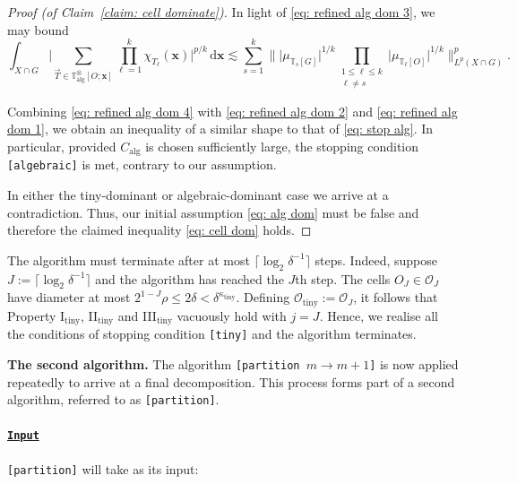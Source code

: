 \documentclass[reqno]{amsart}
\numberwithin{equation}{section}
\newcommand{\T}{\mathbb{T}}
\newcommand{\cO}{\mathcal{O}}
\newcommand{\ud}{\mathrm{d}}
\newcommand{\bx}{\mathbf{x}}
\theoremstyle{plain}
\theoremstyle{definition}
\newcommand{\ttiny}{\mathrm{tiny}}
\newcommand{\alg}{\mathrm{alg}}
\newcommand{\ceil}[1]{\lceil #1 \rceil }
\begin{document}
\begin{proof}[Proof (of Claim~\ref{claim: cell dominate})]
In light of \eqref{eq: refined alg dom 3}, we may bound 
\begin{equation}
\label{eq: refined alg dom 4}
     \int_{X \cap G} \Big|\sum_{\vec{T} \in \T^{\otimes}_{\alg}[O;\bx]} \prod_{\ell = 1}^k \chi_{T_\ell}(\bx) \Big|^{p/k} \,\ud \bx \lesssim \sum_{s = 1}^k \Big\|\big| \mu_{\T_s[G]} \big|^{1/k}\prod_{\substack{1 \leq \ell  \leq k\\ \ell \neq s}}\big| \mu_{\T_{\ell}[O]} \big|^{1/k}\Big\|_{L^p(X \cap G)}^p.
\end{equation}

Combining \eqref{eq: refined alg dom 4} with \eqref{eq: refined alg dom 2} and \eqref{eq: refined alg dom 1}, we obtain an inequality of a similar shape to that of \eqref{eq: stop alg}. In particular, provided $C_{\alg}$ is chosen sufficiently large, the stopping condition \texttt{[algebraic]} is met, contrary to our assumption.\medskip

In either the tiny-dominant or algebraic-dominant case we arrive at a contradiction. Thus, our initial assumption \eqref{eq: alg dom} must be false and therefore the claimed inequality \eqref{eq: cell dom} holds.
\end{proof}

The algorithm must terminate after at most $\ceil{\log_2 \delta^{-1}}$ steps. Indeed, suppose $J := \ceil{\log_2 \delta^{-1}}$ and the algorithm has reached the $J$th step. The cells $O_J \in \cO_J$ have diameter at most $2^{1-J}\rho  \leq 2\delta < \delta^{\kappa_{\ttiny}}$. Defining $\cO_{\ttiny} := \cO_J$, it follows that Property I$_{\ttiny}$, II$_{\ttiny}$ and III$_{\ttiny}$ vacuously hold with $j = J$. Hence, we realise all the conditions of stopping condition \texttt{[tiny]} and the algorithm terminates. \medskip






\noindent\textbf{The second algorithm.} The algorithm \texttt{[partition $m \to m+1$]} is now applied repeatedly to arrive at a final decomposition. This process forms part of a second algorithm, referred to as \texttt{[partition]}.\medskip

\paragraph{\underline{\texttt{Input}}} \texttt{[partition]} will take as its input:
\end{document}
